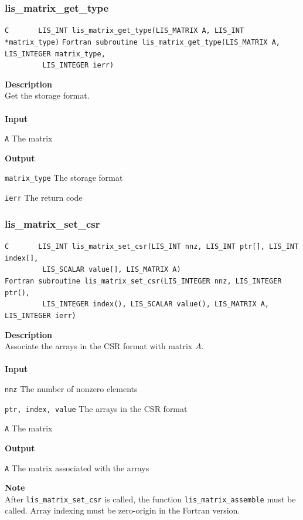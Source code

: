 \documentclass[a4paper]{article}
\newcommand{\namelistlabel}[1]{\mbox{#1}\hfill}
\newenvironment{namelist}[1]{%
\begin{list}{}
  {\let\makelabel\namelistlabel
  \settowidth{\labelwidth}{#1}
  \setlength{\leftmargin}{1.1\labelwidth}}
  }{%
\end{list}}
\begin{document}
\subsubsection{lis\_matrix\_get\_type}
\begin{screen}
\verb|C       LIS_INT lis_matrix_get_type(LIS_MATRIX A, LIS_INT *matrix_type)|
\verb|Fortran subroutine lis_matrix_get_type(LIS_MATRIX A, LIS_INTEGER matrix_type,|\\
\verb|         LIS_INTEGER ierr)|
\end{screen}
{\bf Description}\\
\indent
Get the storage format.
\\ \\
\noindent
{\bf Input}
\begin{namelist}{XXXXXXXXXXXXXXXXXXXX}
\item[\tt A] The matrix
\end{namelist}
{\bf Output}
\begin{namelist}{XXXXXXXXXXXXXXXXXXXX}
\item[\tt matrix\_type] The storage format
\item[\tt ierr] The return code
\end{namelist}

\newpage
\subsubsection{lis\_matrix\_set\_csr}
\begin{screen}
\verb|C       LIS_INT lis_matrix_set_csr(LIS_INT nnz, LIS_INT ptr[], LIS_INT index[],|\\
\verb|         LIS_SCALAR value[], LIS_MATRIX A)|\\
\verb|Fortran subroutine lis_matrix_set_csr(LIS_INTEGER nnz, LIS_INTEGER ptr(),|\\
\verb|         LIS_INTEGER index(), LIS_SCALAR value(), LIS_MATRIX A, LIS_INTEGER ierr)|
\end{screen}
{\bf Description}\\
\indent
Associate the arrays in the CSR format with matrix $A$.
\\ \\
\noindent
{\bf Input}
\begin{namelist}{XXXXXXXXXXXXXXXXXXXX}
\item[\tt nnz] The number of nonzero elements
\item[\tt ptr, index, value] The arrays in the CSR format
\item[\tt A] The matrix
\end{namelist}
{\bf Output}
\begin{namelist}{XXXXXXXXXXXXXXXXXXXX}
\item[\tt A] The matrix associated with the arrays
\end{namelist}
\noindent
{\bf Note}\\
\indent
After \verb|lis_matrix_set_csr| is called, 
the function \verb|lis_matrix_assemble| must be called.
Array indexing must be zero-origin in the Fortran version.
\end{document}
